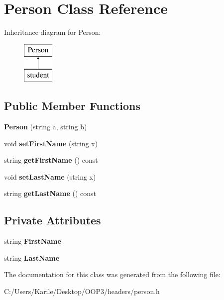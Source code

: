 \hypertarget{class_person}{}\section{Person Class Reference}
\label{class_person}
Inheritance diagram for Person\+:\begin{figure}[H]
\begin{center}
\leavevmode
\includegraphics[height=2.000000cm]{class_person}
\end{center}
\end{figure}
\subsection*{Public Member Functions}
\begin{DoxyCompactItemize}
\item 
\mbox{\label{class_person_a0fd184a93abc3dfa3ef4f9a88fa8c31d}} 
{\bfseries Person} (string a, string b)
\item 
\mbox{\label{class_person_a64d41092075520f0b979c2524bb85197}} 
void {\bfseries set\+First\+Name} (string x)
\item 
\mbox{\label{class_person_a82d6d399c78491a14713d13a32eec63f}} 
string {\bfseries get\+First\+Name} () const
\item 
\mbox{\label{class_person_a97da4d1244a06484d877cfe0cf9a0c43}} 
void {\bfseries set\+Last\+Name} (string x)
\item 
\mbox{\label{class_person_a0fedd009eb25bdd8ece4882b13236a3c}} 
string {\bfseries get\+Last\+Name} () const
\end{DoxyCompactItemize}
\subsection*{Private Attributes}
\begin{DoxyCompactItemize}
\item 
\mbox{\label{class_person_aa7e415d2232d63bebe953227394bdf02}} 
string {\bfseries First\+Name}
\item 
\mbox{\label{class_person_adb7b4b0c1c6d35ff77be67f36bfae396}} 
string {\bfseries Last\+Name}
\end{DoxyCompactItemize}


The documentation for this class was generated from the following file\+:\begin{DoxyCompactItemize}
\item 
C\+:/\+Users/\+Karile/\+Desktop/\+O\+O\+P3/headers/person.\+h\end{DoxyCompactItemize}
